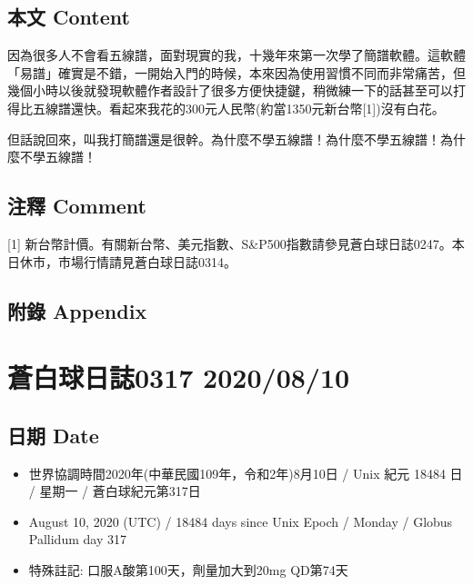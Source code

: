 \documentclass[
]{article}
\providecommand{\tightlist}{%
  \setlength{\itemsep}{0pt}\setlength{\parskip}{0pt}}
\begin{document}
\hypertarget{ux672cux6587-content-8}{%
\subsection{本文 Content}\label{ux672cux6587-content-8}}

因為很多人不會看五線譜，面對現實的我，十幾年來第一次學了簡譜軟體。這軟體「易譜」確實是不錯，一開始入門的時候，本來因為使用習慣不同而非常痛苦，但幾個小時以後就發現軟體作者設計了很多方便快捷鍵，稍微練一下的話甚至可以打得比五線譜還快。看起來我花的300元人民幣(約當1350元新台幣{[}1{]})沒有白花。

但話說回來，叫我打簡譜還是很幹。為什麼不學五線譜！為什麼不學五線譜！為什麼不學五線譜！

\hypertarget{ux6ce8ux91cb-comment-8}{%
\subsection{注釋 Comment}\label{ux6ce8ux91cb-comment-8}}

{[}1{]}
新台幣計價。有關新台幣、美元指數、S\&P500指數請參見蒼白球日誌0247。本日休市，市場行情請見蒼白球日誌0314。

\hypertarget{ux9644ux9304-appendix-8}{%
\subsection{附錄 Appendix}\label{ux9644ux9304-appendix-8}}

\hypertarget{ux84bcux767dux7403ux65e5ux8a8c0317-20200810}{%
\section{蒼白球日誌0317
2020/08/10}\label{ux84bcux767dux7403ux65e5ux8a8c0317-20200810}}

\hypertarget{ux65e5ux671f-date-9}{%
\subsection{日期 Date}\label{ux65e5ux671f-date-9}}

\begin{itemize}
\tightlist
\item
  世界協調時間2020年(中華民國109年，令和2年)8月10日 / Unix 紀元 18484 日
  / 星期一 / 蒼白球紀元第317日
\item
  August 10, 2020 (UTC) / 18484 days since Unix Epoch / Monday / Globus
  Pallidum day 317
\item
  特殊註記: 口服A酸第100天，劑量加大到20mg QD第74天
\end{itemize}
\end{document}
